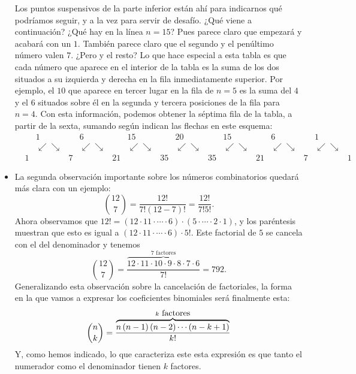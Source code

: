 \begin{itemize}
        Los puntos suspensivos de la parte inferior están ahí para indicarnos qué podríamos seguir, y a la vez para servir de desafío. ¿Qué viene a continuación? ¿Qué hay en la línea $n=15$? Pues parece claro que empezará y acabará con un $1$. También parece claro que el segundo y el penúltimo  número valen $7$. ¿Pero y el resto? Lo que hace especial a esta tabla es que {\sf cada número que aparece en el interior de la tabla es la suma de los dos situados a su izquierda y derecha en la fila inmediatamente superior.} Por ejemplo, el $10$ que aparece en tercer lugar en la fila de $n=5$  es la suma del $4$ y el $6$ situados sobre él en la  segunda y tercera posiciones de la fila para $n=4$. Con esta información, podemos obtener la séptima fila de la tabla, a partir de la sexta, sumando según indican las flechas en este esquema:
        {\small
        \[
        \begin{array}{lcccccccccccccccc}
        &&1&&6&&15&&20&&15&&6&&1\\
           &&\swarrow\searrow&&\swarrow\searrow&&\swarrow\searrow&&\swarrow\searrow&&\swarrow\searrow&&
           \swarrow\searrow&&\swarrow\searrow\\
        &1&&7&&21&&35&&35&&21&&7&&1
        \end{array}
        \]
        }
        \item La segunda observación importante sobre los números combinatorios quedará más clara con un ejemplo:
        \[
        \binom{12}{7}=\dfrac{12!}{7!(12-7)!}=\dfrac{12!}{7!5!}.
        \]
        Ahora observamos que $12!=(12\cdot 11\cdot\cdots\cdot 6)\cdot(5\cdot\cdots\cdot 2\cdot 1)$, y los paréntesis muestran que esto
        es igual a $(12\cdot 11\cdot\cdots\cdot 6)\cdot 5!$. Este factorial de $5$ se cancela con el del denominador y tenemos
        \[
        \binom{12}{7}=\dfrac{\overbrace{12\cdot 11\cdot 10\cdot 9\cdot 8\cdot 7\cdot 6}^{7\mbox{ factores}}}{7!}=792.
        \]
        Generalizando esta observación sobre la cancelación de factoriales, la forma en la que vamos a expresar los coeficientes binomiales será finalmente esta:
        \begin{equation}\label{cap03:ecu:expresionPseudoFactorialCoeficientesBinomiales}
        \dbinom{n}{k}=\frac{\overbrace{n\left( n-1\right) \left( n-2\right) \cdots \left( n-k+1\right) }^{k\mbox{ factores}}}{k!}
        \end{equation}
        Y, como hemos indicado, lo que caracteriza este esta expresión es que tanto el numerador como el denominador tienen $k$ factores.
    \end{itemize}
